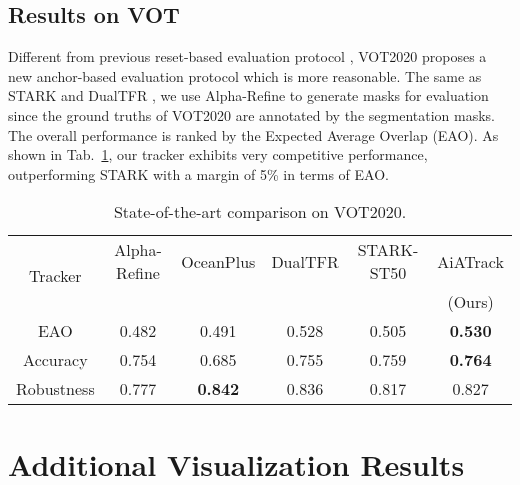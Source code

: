 \subsection{Results on VOT}
Different from previous reset-based evaluation protocol \cite{kristan2019seventh}, VOT2020 \cite{kristan2020eighth} proposes a new anchor-based evaluation protocol which is more reasonable. The same as STARK \cite{yan2021learning} and DualTFR \cite{xie2021learning}, we use Alpha-Refine \cite{yan2021alpha} to generate masks for evaluation since the ground truths of VOT2020 are annotated by the segmentation masks. The overall performance is ranked by the Expected Average Overlap (EAO). As shown in Tab.~\ref{table-vot}, our tracker exhibits very competitive performance, outperforming STARK with a margin of 5\% in terms of EAO.

\begin{table}[t]
\centering
\begin{tabular}{c|ccccc}
\hline
\multirow{2}{*}{Tracker}
& Alpha-Refine & OceanPlus & DualTFR & STARK-ST50 & AiATrack \\
& \cite{yan2021alpha} & \cite{zhang2021toward} & \cite{xie2021learning} & \cite{yan2021learning} & (Ours) \\
\hline
EAO & 0.482 & 0.491 & 0.528 & 0.505 & \textbf{0.530} \\
Accuracy & 0.754 & 0.685 & 0.755 & 0.759 & \textbf{0.764} \\
Robustness & 0.777 & \textbf{0.842} & 0.836 & 0.817 & 0.827 \\
\hline
\end{tabular}
\caption{State-of-the-art comparison on VOT2020.}
\label{table-vot}
\end{table}

\section{Additional Visualization Results}

